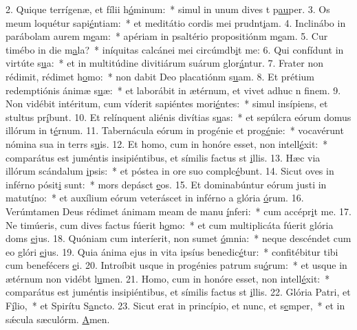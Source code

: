 2. Quique terrígenæ, et fílii h\uline{ó}minum:~* simul in unum dives t p\uline{au}per.
3. Os meum loquétur sapi\uline{é}ntiam:~* et meditátio cordis mei prudnt\uline{i}am.
4. Inclinábo in parábolam aurem m\uline{e}am:~* apériam in psaltério propositiónm m\uline{e}am.
5. Cur timébo in die m\uline{a}la?~* iníquitas calcánei mei circúmdb\uline{i}t me:
6. Qui confídunt in virtúte s\uline{u}a:~* et in multitúdine divitiárum suárum glor\uline{á}ntur.
7. Frater non rédimit, rédimet h\uline{o}mo:~* non dabit Deo placatiónm s\uline{u}am.
8. Et prétium redemptiónis ánimæ s\uline{u}æ:~* et laborábit in ætérnum, et vivet adhuc n f\uline{i}nem.
9. Non vidébit intéritum, cum víderit sapiéntes mori\uline{é}ntes:~* simul insípiens, et stultus pr\uline{í}bunt.
10. Et relínquent aliénis divítias s\uline{u}as:~* et sepúlcra eórum domus illórum in t\uline{é}rnum.
11. Tabernácula eórum in progénie et prog\uline{é}nie:~* vocavérunt nómina sua in terrs s\uline{u}is.
12. Et homo, cum in honóre esset, non intell\uline{é}xit:~* comparátus est juméntis insipiéntibus, et símilis factus st \uline{i}llis.
13. Hæc via illórum scándalum \uline{i}psis:~* et póstea in ore suo complc\uline{é}bunt.
14. Sicut oves in inférno pósit\uline{i} sunt:~* mors depásct \uline{e}os.
15. Et dominabúntur eórum justi in matut\uline{í}no:~* et auxílium eórum veteráscet in inférno a glória \uline{ó}rum.
16. Verúmtamen Deus rédimet ánimam meam de manu \uline{í}nferi:~* cum accépr\uline{i}t me.
17. Ne timúeris, cum dives factus fúerit h\uline{o}mo:~* et cum multiplicáta fúerit glória doms \uline{e}jus.
18. Quóniam cum interíerit, non sumet \uline{ó}mnia:~* neque descéndet cum eo glóri \uline{e}jus.
19. Quia ánima ejus in vita ipsíus benedic\uline{é}tur:~* confitébitur tibi cum benefécers \uline{e}i.
20. Introíbit usque in progénies patrum su\uline{ó}rum:~* et usque in ætérnum non vidébt l\uline{u}men.
21. Homo, cum in honóre esset, non intell\uline{é}xit:~* comparátus est juméntis insipiéntibus, et símilis factus st \uline{i}llis.
22. Glória Patri, et F\uline{í}lio,~* et Spirítu S\uline{a}ncto.
23. Sicut erat in princípio, et nunc, et s\uline{e}mper,~* et in sǽcula sæculórm. \uline{A}men.
